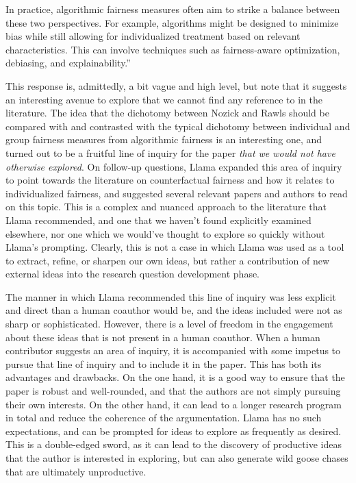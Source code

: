 In practice, algorithmic fairness measures often aim to strike a balance between
these two perspectives. For example, algorithms might be designed to minimize
bias while still allowing for individualized treatment based on relevant
characteristics. This can involve techniques such as fairness-aware
optimization, debiasing, and explainability.''

This response is, admittedly, a bit vague and high level, but note that it
suggests an interesting avenue to explore that we cannot find any reference to
in the literature. The idea that the dichotomy between Nozick and Rawls should
be compared with and contrasted with the typical dichotomy between individual
and group fairness measures from algorithmic fairness is an interesting one, and
turned out to be a fruitful line of inquiry for the paper \emph{that we would
not have otherwise explored}. On follow-up questions, Llama expanded this area
of inquiry to point towards the literature on counterfactual fairness and how it
relates to individualized fairness, and suggested several relevant papers and
authors to read on this topic. This is a complex and nuanced approach to the
literature that Llama recommended, and one that we haven't found explicitly
examined elsewhere, nor one which we would've thought to explore so quickly
without Llama's prompting. Clearly, this is not a case in which Llama was used
as a tool to extract, refine, or sharpen our own ideas, but rather a
contribution of new external ideas into the research question development phase.

The manner in which Llama recommended this line of inquiry was less explicit and
direct than a human coauthor would be, and the ideas included were not as sharp
or sophisticated. However, there is a level of freedom in the engagement about 
these ideas that is not present in a human coauthor. When a human contributor
suggests an area of inquiry, it is accompanied with some impetus to pursue that
line of inquiry and to include it in the paper. This has both its advantages and
drawbacks. On the one hand, it is a good way to ensure that the paper is
robust and well-rounded, and that the authors are not simply pursuing their
own interests. On the other hand, it can lead to a longer research program in
total and reduce the coherence of the argumentation. Llama has no such
expectations, and can be prompted for ideas to explore as frequently as desired.
This is a double-edged sword, as it can lead to the discovery of productive
ideas that the author is interested in exploring, but can also generate wild
goose chases that are ultimately unproductive.

